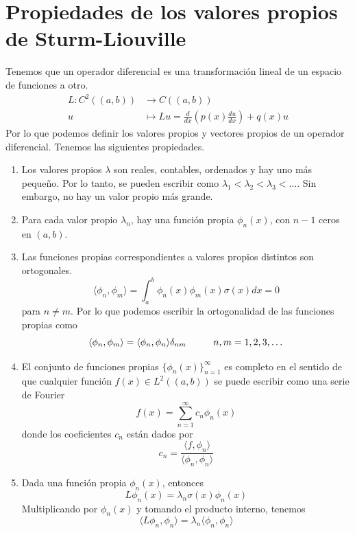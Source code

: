 \documentclass[11pt]{book}
\theoremstyle{plain}
\theoremstyle{definition}
\begin{document}
    \section{Propiedades de los valores propios de Sturm-Liouville}
    Tenemos que un operador diferencial es una transformación lineal de un espacio de funciones a otro.
    \[
        \begin{split}
            L: C^{2}((a,b)) &\to C((a,b))\\
            u &\mapsto Lu = \frac{d}{dx}\left(p(x)\frac{du}{dx}\right) + q(x)u
        \end{split}
    \]
    Por lo que podemos definir los valores propios y vectores propios de un operador diferencial. Tenemos las siguientes propiedades.
    \begin{enumerate}
        \item Los valores propios $\lambda$ son reales, contables, ordenados y hay uno más pequeño. Por lo tanto, se pueden escribir como $\lambda_{1} < \lambda_{2} < \lambda_{3} < \dots$. Sin embargo, no hay un valor propio más grande.
        \item Para cada valor propio $\lambda_{n}$, hay una función propia $\phi_{n}(x)$, con $n-1$ ceros en $(a,b)$.
        \item Las funciones propias correspondientes a valores propios distintos son ortogonales.
        \[
            \langle \phi_{n}, \phi_{m} \rangle = \int_{a}^{b} \phi_{n}(x)\phi_{m}(x)\sigma(x)dx = 0
        \]
        para $n \neq m$. Por lo que podemos escribir la ortogonalidad de las funciones propias como
        \[
            \langle \phi_{n}, \phi_{m} \rangle = \langle \phi_{n}, \phi_{n} \rangle\delta_{nm} \hspace{10mm} n,m = 1,2,3,\dots
        \]
        \item El conjunto de funciones propias $\{\phi_{n}(x)\}_{n=1}^{\infty}$ es completo en el sentido de que cualquier función $f(x) \in L^{2}((a,b))$ se puede escribir como una serie de Fourier
        \[
            f(x) = \sum_{n=1}^{\infty} c_{n}\phi_{n}(x)
        \]
        donde los coeficientes $c_{n}$ están dados por
        \[
            c_{n} = \frac{\langle f, \phi_{n} \rangle}{\langle \phi_{n}, \phi_{n} \rangle}
        \]
        \item Dada una función propia $\phi_{n}(x)$, entonces
        \[
            L \phi_{n}(x) = \lambda_{n}\sigma(x)\phi_{n}(x)
        \]
        Multiplicando por $\phi_{n}(x)$ y tomando el producto interno, tenemos
        \[
            \langle L \phi_{n}, \phi_{n} \rangle = \lambda_{n}\langle \phi_{n}, \phi_{n} \rangle
\]
\end{enumerate}
\end{document}
